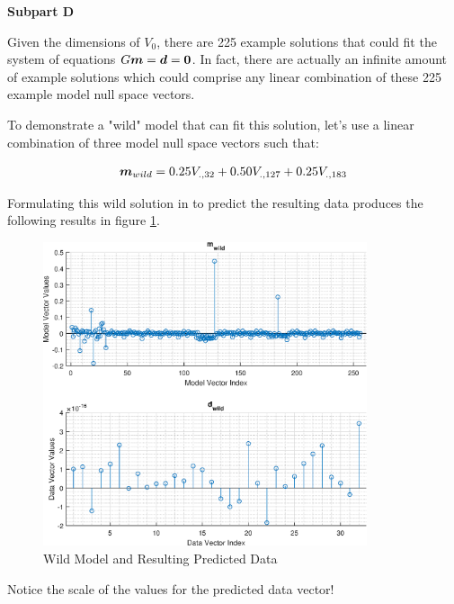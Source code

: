 \textbf{Subpart D} \newline

Given the dimensions of $V_0$, there are 225 example solutions that could fit the system of equations $G\boldsymbol{m} = \boldsymbol{d} = \boldsymbol{0}$. In fact, there are actually an infinite amount of example solutions which could comprise any linear combination of these 225 example model null space vectors. 

To demonstrate a "wild" model that can fit this solution, let's use a linear combination of three model null space vectors such that:

\begin{align*}
	\boldsymbol{m}_{wild} = 0.25 V_{.,32} + 0.50 V_{.,127} + 0.25 V_{.,183}
\end{align*}

Formulating this wild solution in \MATLAB to predict the resulting data produces the following results in figure \ref{fig: prob2 part A wild data and model}.

\begin{figure}[h] 
	\centering
	\includegraphics[width=0.85\textwidth]{./images/prob2_partA_wild_model_and_data.eps}
	\caption{Wild Model and Resulting Predicted Data}
	\label{fig: prob2 part A wild data and model}
\end{figure}
\FloatBarrier

Notice the scale of the values for the predicted data vector!



